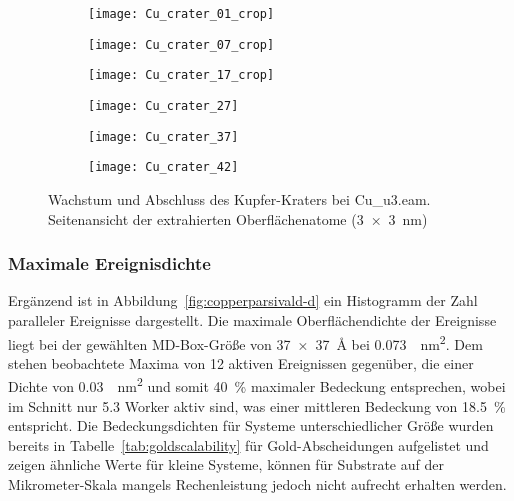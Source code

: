 \begin{figure}

  \captionsetup[subfigure]{justification=centering,singlelinecheck=false}
  \def\subfigwidth{0.32\textwidth}

  \begin{subfigure}[t]{\subfigwidth}
    \texttt{[image: Cu\_crater\_01\_crop]}
  \end{subfigure}
  \hfill
  \begin{subfigure}[t]{\subfigwidth}
    \texttt{[image: Cu\_crater\_07\_crop]}
  \end{subfigure}
  \hfill
  \begin{subfigure}[t]{\subfigwidth}
    \texttt{[image: Cu\_crater\_17\_crop]}
  \end{subfigure}

  \begin{subfigure}[t]{\subfigwidth}
    \texttt{[image: Cu\_crater\_27]}
  \end{subfigure}
  \hfill
  \begin{subfigure}[t]{\subfigwidth}
    \texttt{[image: Cu\_crater\_37]}
  \end{subfigure}
  \hfill
  \begin{subfigure}[t]{\subfigwidth}
    \texttt{[image: Cu\_crater\_42]}
  \end{subfigure}

  \caption{Wachstum und Abschluss des Kupfer-Kraters bei Cu\_u3.eam.\\
    Seitenansicht der extrahierten Oberflächenatome (\SI{3x3}{\nano\meter})
  }
  \label{fig:coppercrater}
\end{figure}

\subsubsection{Maximale Ereignisdichte}
Ergänzend ist in Abbildung~\ref{fig:copperparsivald-d} ein Histogramm der Zahl paralleler Ereignisse dargestellt.
Die maximale Oberflächendichte der Ereignisse liegt bei der gewählten MD-Box-Größe von \SI{37x37}{\angstrom} bei \SI{0.073}{\per\nano\meter\squared}.
Dem stehen beobachtete Maxima von \num{12} aktiven Ereignissen gegenüber, die einer Dichte von \SI{0.03}{\per\nano\meter\squared} und somit \SI{40}{\percent} maximaler Bedeckung entsprechen, wobei im Schnitt nur \num{5.3} Worker aktiv sind, was einer mittleren Bedeckung von \SI{18.5}{\percent} entspricht.
Die Bedeckungsdichten für Systeme unterschiedlicher Größe wurden bereits in Tabelle~\ref{tab:goldscalability} für Gold-Abscheidungen aufgelistet und zeigen ähnliche Werte für kleine Systeme, können für Substrate auf der Mikrometer-Skala mangels Rechenleistung jedoch nicht aufrecht erhalten werden.
